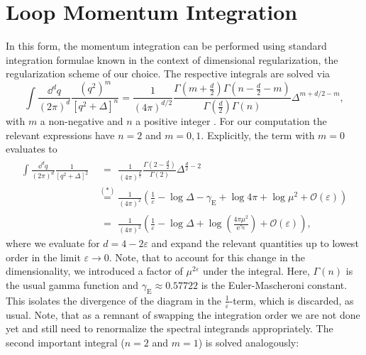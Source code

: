 \section*{Loop Momentum Integration}
In this form, the momentum integration can be performed using standard integration formulae known in the context of dimensional regularization, the regularization scheme of our choice. The respective integrals are solved via
\begin{equation}
	\int\frac{\dd^d q}{(2\pi)^d}\frac{(q^2)^m}{\left[q^2 + \Delta\right]^n} = \frac{1}{(4\pi)^{d/2}}\frac{\Gamma(m+\frac{d}{2})\Gamma(n-\frac{d}{2}-m)}{\Gamma(\frac{d}{2})\Gamma(n)} \Delta^{m+d/2-m},
\end{equation} 
with $m$ a non-negative and $n$ a positive integer \cite{PeskinSchroeder1995}. For our computation the relevant expressions have $n=2$ and $m= 0,1$. Explicitly, the term with $m=0$ evaluates to
\begin{equation}
\begin{aligned}
	\int \frac{\dd^d q}{(2\pi)^d} \frac{1}{\left[q^2 + \Delta\right]^2} &\overset{\phantom{(*)}}{=}  \frac{1}{(4\pi)^{\frac{d}{2}}} \frac{\Gamma(2-\frac{d}{2})}{\Gamma(2)} \Delta^{\frac{d}{2}-2} \\
	&\overset{(*)}{=} \frac{1}{(4\pi)^{2}}\left(\frac{1}{\varepsilon} - \operatorname{log}\Delta - \gamma_{\mathrm{E}} + \operatorname{log} 4\pi + \operatorname{log} \mu^2 + \mathcal{O}(\varepsilon)\right)\\
	&\overset{\phantom{(*)}}{=} \frac{1}{(4\pi)^{2}}\left(\frac{1}{\varepsilon} - \operatorname{log}\Delta + \operatorname{log}\left(\frac{4\pi\mu^2}{\operatorname{e}^{\gamma_{\mathrm{E}}}}\right)   + \mathcal{O}(\varepsilon)\right),
	\end{aligned}
\end{equation}
where we evaluate for $d= 4 -2\varepsilon$ and expand the relevant quantities up to lowest order in the limit $\varepsilon\rightarrow 0$. Note, that to account for this change in the dimensionality, we introduced a factor of $\mu^{2\varepsilon}$ under the integral. Here, $\Gamma(n)$ is the usual gamma function and  $\gamma_{\mathrm{E}}\approx 0.57722$ is the Euler-Mascheroni constant.\\ This isolates the divergence of the diagram in the $\frac{1}{\varepsilon}$-term, which is discarded, as usual. Note, that as a remnant of swapping the integration order we are not done yet and still need to renormalize the spectral integrands appropriately. The second important integral ($n=2$ and $m=1$) is solved analogously:
